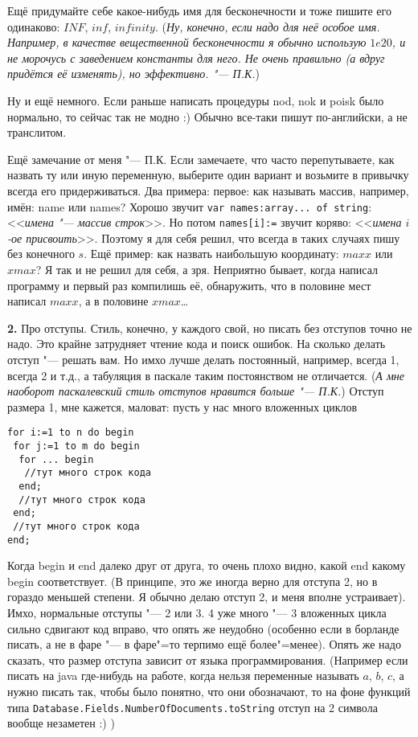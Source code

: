   Ещё придумайте себе какое-нибудь имя для бесконечности и тоже пишите его одинаково: $INF$, $inf$, $infinity$. 
(\textsl{Ну, конечно, если надо для неё особое имя. Например, в качестве вещественной бесконечности 
я обычно использую $1e20$, и не морочусь с заведением константы для него. Не очень правильно (а 
вдруг придётся её изменять), но эффективно. "--- П.К.})

  Ну и ещё немного. Если раньше написать процедуры nod, nok и poisk было нормально, то сейчас так не модно :) 
Обычно все-таки пишут по-английски, а не транслитом.

Ещё замечание от меня "--- П.К. Если замечаете, что часто перепутываете, как назвать ту или иную 
переменную, выберите один вариант и возьмите в привычку всегда его придерживаться. Два примера: первое: как 
называть массив, например, имён: name или names? Хорошо звучит \texttt{var names:array... of string}: <<\textit{имена "--- 
массив строк}>>. Но потом \texttt{names[i]:=} звучит коряво: <<\textit{имена $i$-ое присвоить}>>. Поэтому 
я для себя решил, что всегда в таких случаях пишу без конечного $s$. Ещё пример: как назвать 
наибольшую координату: $maxx$ или $xmax$? Я так и не решил для себя, а зря. Неприятно бывает, когда 
написал программу и первый раз компилишь её, обнаружить, что в половине мест написал $maxx$, а в половине 
$xmax$\dots

\textbf{2.} Про отступы. Стиль, конечно, у каждого свой, но писать без отступов точно не надо. Это крайне затрудняет чтение 
кода и поиск ошибок. На сколько делать отступ "--- решать вам. Но имхо лучше делать постоянный, например, всегда 1, 
всегда 2 и т.д., а табуляция в паскале таким постоянством не отличается. (\textsl{А мне наоборот 
паскалевский стиль отступов нравится больше "--- П.К.})
Отступ размера 1, мне кажется, маловат: пусть у нас много вложенных циклов
\begin{codesampleo}\begin{verbatim}
for i:=1 to n do begin
 for j:=1 to m do begin
  for ... begin
   //тут много строк кода
  end;
  //тут много строк кода
 end;
 //тут много строк кода
end;    
\end{verbatim}
\end{codesampleo}
Когда begin и end далеко друг от друга, то очень плохо видно, какой end какому begin соответствует. (В принципе, 
это же иногда верно для отступа 2, но в гораздо меньшей степени. Я обычно делаю отступ 2, и меня вполне 
устраивает). Имхо, нормальные отступы "--- 2 или 3. 4 уже много "--- 3 вложенных цикла сильно сдвигают код вправо, 
что опять же неудобно (особенно если в борланде писать, а не в фаре "--- в фаре"=то терпимо ещё более"=менее). 
Опять же надо сказать, что размер отступа зависит от языка программирования. (Например если писать на java 
где-нибудь на работе, когда нельзя переменные называть $a$, $b$, $c$, а нужно писать так, чтобы было понятно, что они 
обозначают, то на фоне функций типа \texttt{Database.Fields.NumberOfDocuments.toString} отступ на 2 символа вообще 
незаметен :) )

